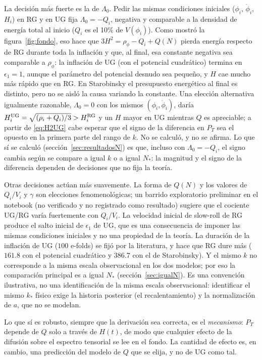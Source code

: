 La decisión más fuerte es la de $\Lambda_0$. Pedir las mismas condiciones iniciales ($\phi_i$, $\dot\phi_i$, $H_i$) en RG y en UG fija $\Lambda_0=-Q_i$, negativa y comparable a la densidad de energía total al inicio ($Q_i$ es el 10\% de $V(\phi_i)$). Como mostró la figura~\ref{fig:fondo}, eso hace que $3H^2=\rho_\phi-Q_i+Q(N)$ pierda energía respecto de RG durante toda la inflación y que, al final, esa constante negativa sea comparable a $\rho_\phi$: la inflación de UG (con el potencial cuadrático) termina en $\epsilon_1=1$, aunque el parámetro del potencial desnudo sea pequeño, y $H$ cae mucho más rápido que en RG. En Starobinsky el presupuesto energético al final es distinto, pero no se aisló la causa variando la constante. Una elección alternativa igualmente razonable, $\Lambda_0=0$ con los mismos $(\phi_i,\dot\phi_i)$, daría $H_i^{\rm UG}=\sqrt{(\rho_i+Q_i)/3}>H_i^{\rm RG}$ y un $H$ mayor en UG mientras $Q$ es apreciable; a partir de \eqref{eq:H2UG} cabe esperar que el signo de la diferencia en $P_T$ sea el opuesto en la primera parte del rango de $k$. No se calculó, y no se afirma. Lo que sí se calculó (sección~\ref{sec:resultadosN}) es que, incluso con $\Lambda_0=-Q_i$, el signo cambia según se compare a igual $k$ o a igual $N_*$: la magnitud y el signo de la diferencia dependen de decisiones que no fija la teoría.

Otras decisiones actúan más suavemente. La forma de $Q(N)$ y los valores de $Q_i/V_i$ y $\gamma$ son elecciones fenomenológicas; un barrido exploratorio preliminar en el notebook (no verificado y no registrado como resultado) sugiere que el cociente UG/RG varía fuertemente con $Q_i/V_i$. La velocidad inicial de slow-roll de RG produce el salto inicial de $\epsilon_1$ de UG, que es una consecuencia de imponer las mismas condiciones iniciales y no una propiedad de la teoría. La duración de la inflación de UG ($100$ e-folds) se fijó por la literatura, y hace que RG dure más ($161.8$ con el potencial cuadrático y $386.7$ con el de Starobinsky). Y el mismo $k$ no corresponde a la misma escala observacional en los dos modelos; por eso la comparación principal es a igual $N_*$ (sección~\ref{sec:igualN}). Es una convención ilustrativa, no una identificación de la misma escala observacional: identificar el mismo $k_*$ físico exige la historia posterior (el recalentamiento) y la normalización de $a$, que no se modelan.

Lo que sí es robusto, siempre que la derivación sea correcta, es el \emph{mecanismo}: $P_T$ depende de $Q$ solo a través de $H(t)$, de modo que cualquier efecto de la difusión sobre el espectro tensorial se lee en el fondo. La cantidad de efecto es, en cambio, una predicción del modelo de $Q$ que se elija, y no de UG como tal.

